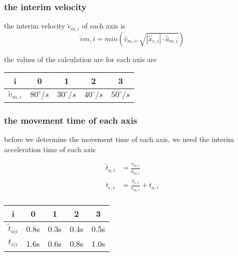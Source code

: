 \documentclass[%
  professionalfonts,%
  xcolor={%
    usenames,%
    dvipsnames,%
    svgnames,%
    table,%
    hyperref%
  }%
]{beamer}
\begin{document}
\subsubsection*{the interim velocity}
\begin{frame}
the interim velocity $\tilde{v}_{m,i}$ of each axis is 
\begin{equation*}
\tilde{v}{m,i} = min\left(\hat{v}_{m,i},\sqrt{|\hat{x}_{e,i}| \cdot \hat{a}_{m,i}} \right) 
\end{equation*}

the values of the calculation are for each axis are
\begin{center}
\begin{tabular}{ccccc}
\toprule
i & 0 & 1 & 2 & 3 \\
\midrule
$\tilde{v}_{m,i}$ & $80^\circ/s$ & $30^\circ/s$ & $40^\circ/s$ & $50^\circ/s$ \\
\bottomrule
\end{tabular}               
\end{center}  
\end{frame}

\subsubsection*{the movement time of each axis}
\begin{frame}
before we determine the movement time of each axis, we need the interim acceleration time of each axis

\begin{align*}
\tilde{t}_{a,i} & = \frac{v_{m,i}}{\hat{a}_{m,i}} \\
t_{e,i} & = \frac{\hat{x}_{e,i}}{v_{m,i}} + t_{a,i} \\
\end{align*}

\begin{center}
\begin{tabular}{ccccc}
\toprule
i & 0 & 1 & 2 & 3 \\
\midrule
$\tilde{t}_{a|i}$ & 0.8s & 0.3s & 0.4s & 0.5s \\ 
$t_{e|i}$ & 1.6s & 0.6s & 0.8s & 1.0s \\
\bottomrule 
\end{tabular}
\end{center} 
\end{frame}
\end{document}

